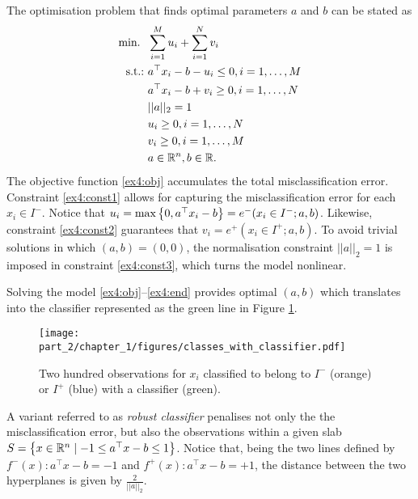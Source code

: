 The optimisation problem that finds optimal parameters $a$ and $b$ can be stated as
%
\begin{align}
	\mathop{\text{min.~}} \ & \sum_{i=1}^M u_i + \sum_{i=1}^N v_i \label{ex4:obj}\\
	\mathop{\text{s.t.:~}} & a^\top x_i - b - u_i \leq 0, i = 1, \dots, M \label{ex4:const1} \\
    & a^\top x_i - b + v_i \geq 0, i = 1,\dots,N \label{ex4:const2} \\
    & ||a||_2 = 1 \label{ex4:const3} \\
    & u_i \geq 0, i = 1, \dots, N \\
    & v_i \geq 0, i = 1, \dots, M \\
    & a \in \mathbb{R}^n, b \in \mathbb{R}. \label{ex4:end}   
\end{align} 
%
The objective function \eqref{ex4:obj} accumulates the total misclassification error. Constraint \eqref{ex4:const1} allows for capturing the misclassification error for each $x_i \in I^-$. Notice that $u_i = \max\left\{ 0, a^\top x_i -b \right \} = e^-(x_i \in I^-; a, b)$. Likewise, constraint \eqref{ex4:const2} guarantees that $v_i = e^+(x_i \in I^+; a, b)$.
To avoid trivial solutions in which $(a,b) = (0, 0)$, the normalisation constraint $|| a ||_2 = 1$ is imposed in constraint \eqref{ex4:const3}, which turns the model nonlinear.

Solving the model \eqref{ex4:obj}--\eqref{ex4:end} provides optimal $(a,b)$ which translates into the classifier represented as the green line in Figure \ref{fig:observations_with_classifier}.

\begin{figure}[h]
    \texttt{[image: part\_2/chapter\_1/figures/classes\_with\_classifier.pdf]}
    \caption{Two hundred observations for $x_i$ classified to belong to $I^-$ (orange) or $I^+$ (blue) with a classifier (green).}        
    \label{fig:observations_with_classifier}
\end{figure}
 
A variant referred to as \emph{robust classifier} penalises not only the the misclassification error, but also the observations within a given slab $S = \left\{ x \in \mathbb{R}^n \mid -1 \leq a^\top x - b \leq 1 \right \}$. Notice that, being the two lines defined by $f^-(x) : a^\top x - b = -1$ and $f^+(x) : a^\top x - b = +1$, the distance between the two hyperplanes is given by $\frac{2}{||a||_2}$. 


